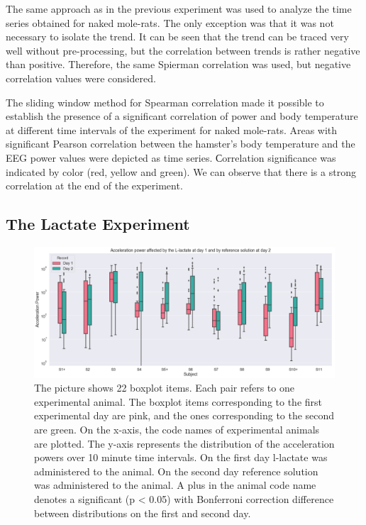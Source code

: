 \documentclass[14pt,a4paper]{scrartcl}
\begin{document}
The same approach as in the previous experiment was used to analyze the time series obtained for naked mole-rats. The only exception was that it was not necessary to isolate the trend.
It can be seen that the trend can be traced very well without pre-processing, but the correlation between trends is rather negative than positive. Therefore, the same Spierman correlation was used, but negative correlation values were considered.

The sliding window method for Spearman correlation made it possible to establish the presence of a significant correlation of power and body temperature at different time intervals of the experiment for naked mole-rats. Areas with significant Pearson correlation between the hamster's body temperature and the EEG power values were depicted as time series. Сorrelation significance was indicated by color (red, yellow and green). We can observe that there is a strong correlation at the end of the experiment. 



\subsection{The Lactate Experiment}
\label{sec:Results:The Lactate Experiment}

\begin{figure}[H]
\centering
\includegraphics[width=\linewidth]{exp4_1.png}
\caption{The picture shows 22 boxplot items. Each pair refers to one experimental animal. The boxplot items corresponding to the first experimental day are pink, and the ones corresponding to the second are green. On the x-axis, the code names of experimental animals are plotted. The y-axis represents the distribution of the acceleration powers over 10 minute time intervals. On the first day l-lactate was administered to the animal. On the second day reference solution was administered to the animal. A plus in the animal code name denotes a significant (p < 0.05) with Bonferroni correction difference between distributions on the first and second day.
}\label{fig:exp4_1}
\end{figure}
\end{document}
